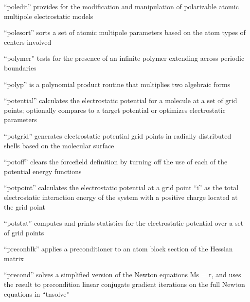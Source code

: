 \documentclass[letterpaper,11pt,english]{sphinxmanual}
\begin{document}

“poledit” provides for the modification and manipulation
of polarizable atomic multipole electrostatic models


“polesort” sorts a set of atomic multipole parameters based
on the atom types of centers involved


“polymer” tests for the presence of an infinite polymer
extending across periodic boundaries


“polyp” is a polynomial product routine that multiplies two
algebraic forms


“potential” calculates the electrostatic potential for a
molecule at a set of grid points; optionally compares to a
target potential or optimizes electrostatic parameters


“potgrid” generates electrostatic potential grid points in
radially distributed shells based on the molecular surface



“potoff” clears the forcefield definition by turning off
the use of each of the potential energy functions


“potpoint” calculates the electrostatic potential at a grid
point “i” as the total electrostatic interaction energy of
the system with a positive charge located at the grid point


“potstat” computes and prints statistics for the electrostatic
potential over a set of grid points



“preconblk” applies a preconditioner to an atom block section
of the Hessian matrix


“precond” solves a simplified version of the Newton equations
Ms = r, and uses the result to precondition linear conjugate
gradient iterations on the full Newton equations in “tnsolve”
\end{document}
